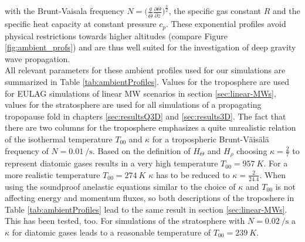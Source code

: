 with the Brunt-Vaisala frequency $N=\bigl(\frac{g}{\bar{\Theta}}\frac{\partial \bar{\Theta}}{\partial z}\bigr)^{\frac{1}{2}}$, the specific gas constant $R$ and the specific heat capacity at constant pressure $c_p$. These exponential profiles avoid physical restrictions towards higher altitudes (compare Figure \ref{fig:ambient_profs}) and are thus well suited for the investigation of deep gravity wave propagation. \\
All relevant parameters for these ambient profiles used for our simulations are summarized in Table \ref{tab:ambientProfiles}. Values for the troposphere are used for EULAG simulations of linear MW scenarios in section \ref{sec:linear-MWs}, values for the stratosphere are used for all simulations of a propagating tropopause fold in chapters \ref{sec:resultsQ3D} and \ref{sec:results3D}. The fact that there are two columns for the troposphere emphasizes a quite unrealistic relation of the isothermal temperature $T_{00}$ and $\kappa$ for a tropospheric Brunt-Väisälä frequency of $N=\SI{0.01}{\per\second}$. Based on the definition of $H_{\Theta}$ and $H_{\rho}$ choosing $\kappa=\frac{2}{7}$ to represent diatomic gases results in a very high temperature $T_{00} = \SI{957}{K}$. For a more realistic temperature $T_{00} = \SI{274}{K}$ $\kappa$ has to be reduced to $\kappa=\frac{2}{24.4}$. When using the soundproof anelastic equations similar to \textcite[]{lipps_scale_1982} the choice of $\kappa$ and $T_{00}$ is not affecting energy and momentum fluxes, so both descriptions of the troposhere in Table \ref{tab:ambientProfiles} lead to the same result in section \ref{sec:linear-MWs}. This has been tested, too. For simulations of the stratosphere with $N=\SI{0.02}{\per\second}$ a $\kappa$ for diatomic gases leads to a reasonable temperature of $T_{00} = \SI{239}{K}$.
